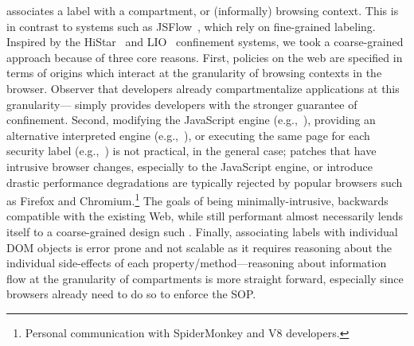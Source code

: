 \sys{} associates a label with a compartment, or (informally) browsing
context.
%
This is in contrast to systems such as JSFlow~\cite{Hedin:2012}, 
which rely on fine-grained labeling.
%
Inspired by the HiStar~\cite{Zeldovich:2006} and
LIO~\cite{stefan:2011:flexible,stefan:addressing-covert} confinement systems, we took a coarse-grained
approach because of three core reasons.
%
First, policies on the web are specified in terms of origins which
interact at the granularity of browsing contexts in the browser.
%
Observer that developers already compartmentalize applications at this
granularity---\sys{} simply provides developers with the stronger
guarantee of confinement.
%
Second, modifying the JavaScript engine
(e.g.,~), providing an alternative interpreted
engine (e.g.,~\cite{Hedin:2012}), or executing the same page for each
security label (e.g.,~\cite{DeGroef:2012}) is not practical, in the
general case; patches that have intrusive browser changes, especially
to the JavaScript engine, or introduce drastic performance
degradations are typically rejected by popular browsers such as
Firefox and Chromium.\footnote{
  Personal communication with SpiderMonkey and V8 developers.
}
%
The goals of being minimally-intrusive, backwards compatible with the
existing Web, while still performant almost necessarily lends itself
to a coarse-grained design such \sys{}.
%
Finally, associating labels with individual DOM objects is error
prone and not scalable as it requires reasoning about the individual
side-effects of each property/method---reasoning about information
flow at the granularity of compartments is more straight forward,
especially since browsers already need to do so to enforce the SOP.


